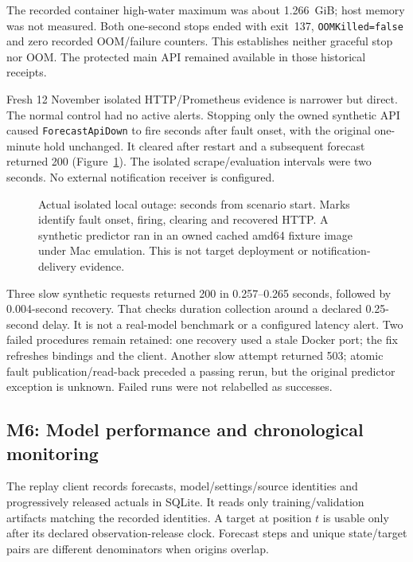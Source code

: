 \documentclass[a4paper,11pt]{article}
\begin{document}
The recorded container high-water maximum was about 1.266~GiB; host memory was
not measured. Both one-second stops ended with exit~137, \texttt{OOMKilled=false}
and zero recorded OOM/failure counters. This establishes neither graceful stop
nor OOM. The protected main API remained available in those historical receipts.

Fresh 12 November isolated HTTP/Prometheus evidence is narrower but direct. The
normal control had no active alerts. Stopping only the owned synthetic API caused
\texttt{ForecastApiDown} to fire \OutageDelay{} seconds after fault onset, with
the original one-minute hold unchanged. It cleared after restart and a subsequent
forecast returned 200 (Figure~\ref{fig:outage}). The isolated scrape/evaluation
intervals were two seconds. No external notification receiver is configured.

\begin{figure}[ht]\centering

\caption{Actual isolated local outage: seconds from scenario start. Marks identify
fault onset, firing, clearing and recovered HTTP. A synthetic predictor ran in
an owned cached amd64 fixture image under Mac emulation. This is not target
deployment or notification-delivery evidence.}\label{fig:outage}
\end{figure}

Three slow synthetic requests returned 200 in 0.257--0.265 seconds, followed by
0.004-second recovery. That checks duration collection around a declared
0.25-second delay. It is not a real-model benchmark or a configured latency alert.
Two failed procedures remain retained: one recovery used a stale Docker port;
the fix refreshes bindings and the client. Another slow attempt returned 503;
atomic fault publication/read-back preceded a passing rerun, but the original
predictor exception is unknown. Failed runs were not relabelled as successes.

\subsection{M6: Model performance and chronological monitoring}

The replay client records forecasts, model/settings/source identities and
progressively released actuals in SQLite. It reads only training/validation
artifacts matching the recorded identities. A target at position $t$ is usable
only after its declared observation-release clock. Forecast steps and unique
state/target pairs are different denominators when origins overlap.
\end{document}
